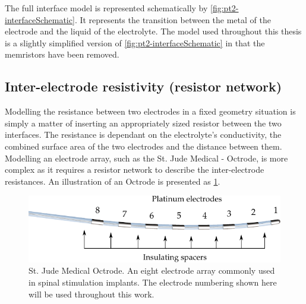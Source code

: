   The full interface model is represented schematically by \cref{fig:pt2-interfaceSchematic}.
  It represents the transition between the metal of the electrode and the liquid of the electrolyte.
  The model used throughout this thesis is a slightly simplified version of \cref{fig:pt2-interfaceSchematic} in that the memristors have been removed.





  \subsection{Inter-electrode resistivity (resistor network)}


    Modelling the resistance between two electrodes in a fixed geometry situation is simply a matter of inserting an appropriately sized resistor between the two interfaces.
    The resistance is dependant on the electrolyte's conductivity, the combined surface area of the two electrodes and the distance between them.
    Modelling an electrode array, such as the St. Jude Medical - Octrode, is more complex as it requires a resistor network to describe the inter-electrode resistances.
    An illustration of an Octrode is presented as \cref{fig:StJudeOctrode_Labelled}.

    \begin{figure}
      \centering
      \includegraphics{content/pt2/07-InterfaceModel/graphics/StJudeOctrodeDiagram}
      \caption{\label{fig:StJudeOctrode_Labelled}St. Jude Medical Octrode. An eight electrode array commonly used in spinal stimulation implants. The electrode numbering shown here will be used throughout this work.}
    \end{figure}

